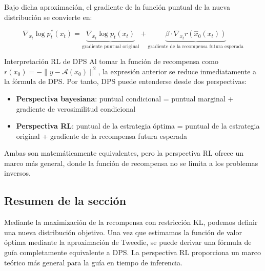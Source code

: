 Bajo dicha aproximación, el gradiente de la función puntual de la nueva distribución se convierte en:

$$\nabla_{x_t} \log p_t^*(x_t) = \underbrace{\nabla_{x_t} \log p_t(x_t)}_{\text{gradiente puntual original}} + \underbrace{\beta \cdot \nabla_{x_t} r(\hat{x}_0(x_t))}_{\text{gradiente de la recompensa futura esperada}}$$

\begin{importantbox}{Interpretación RL de DPS}
Al tomar la función de recompensa como $r(x_0) = -\| y - \mathcal{A}(x_0) \|^2$, la expresión anterior se reduce inmediatamente a la fórmula de DPS. Por tanto, DPS puede entenderse desde dos perspectivas:
\begin{itemize}
    \item \textbf{Perspectiva bayesiana}: puntual condicional = puntual marginal + gradiente de verosimilitud condicional
    \item \textbf{Perspectiva RL}: puntual de la estrategia óptima = puntual de la estrategia original + gradiente de la recompensa futura esperada
\end{itemize}
Ambas son matemáticamente equivalentes, pero la perspectiva RL ofrece un marco más general, donde la función de recompensa no se limita a los problemas inversos.
\end{importantbox}

\subsection{Resumen de la sección}

Mediante la maximización de la recompensa con restricción KL, podemos definir una nueva distribución objetivo. Una vez que estimamos la función de valor óptima mediante la aproximación de Tweedie, se puede derivar una fórmula de guía completamente equivalente a DPS. La perspectiva RL proporciona un marco teórico más general para la guía en tiempo de inferencia.

